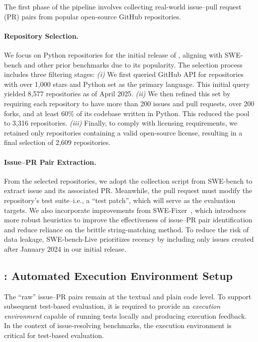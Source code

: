 The first phase of the \benchmark pipeline involves collecting real-world issue–pull request (PR) pairs from popular open-source GitHub repositories.

\paragraph{Repository Selection.}
We focus on Python repositories for the initial release of \benchmark, aligning with SWE-bench and other prior benchmarks due to its popularity. The selection process includes three filtering stages:
\textit{(i)} We first queried GitHub API for repositories with over 1,000 stars and Python set as the primary language. This initial query yielded 8,577 repositories as of April 2025.
\textit{(ii)} We then refined this set by requiring each repository to have more than 200 issues and pull requests, over 200 forks, and at least 60\% of its codebase written in Python. This reduced the pool to 3,316 repositories.
\textit{(iii)} Finally, to comply with licensing requirements, we retained only repositories containing a valid open-source license, resulting in a final selection of 2,609 repositories.

\paragraph{Issue–PR Pair Extraction.}
From the selected repositories, we adopt the collection script from SWE-bench to extract issue and its associated PR. Meanwhile, the pull request must modify the repository’s test suite--i.e., a ``test patch'', which will serve as the evaluation targets. We also incorporate improvements from SWE-Fixer~\cite{xie2025swe}, which introduces more robust heuristics to improve the effectiveness of issue–PR pair identification and reduce reliance on the brittle string-matching method. 
To reduce the risk of data leakage, SWE-bench-Live prioritizes recency by including only issues created after January 2024 in our initial release.

\subsection{\method: Automated Execution Environment Setup} %

The ``raw'' issue–PR pairs remain at the textual and plain code level. To support subsequent test-based evaluation, it is required to provide an \textit{execution environment} capable of running tests locally and producing execution feedback. In the context of issue-resolving benchmarks, the execution environment is critical for test-based evaluation.

